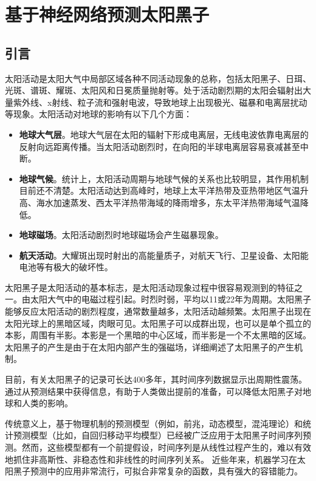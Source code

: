 \chapter{基于神经网络预测太阳黑子}\label{chap:ml_sunspot}

\section{引言}\label{sec:ss_intro}

太阳活动是太阳大气中局部区域各种不同活动现象的总称，包括太阳黑子、日珥、光斑、谱斑、耀斑、太阳风和日冕质量抛射等。处于活动剧烈期的太阳会辐射出大量紫外线、x射线、粒子流和强射电波，导致地球上出现极光、磁暴和电离层扰动等现象。太阳活动对地球的影响有以下几个方面\citep{jie2012prediction}：
\begin{itemize}
  \item \textbf{地球大气层}。地球大气层在太阳的辐射下形成电离层，无线电波依靠电离层的反射向远距离传播。当太阳活动剧烈时，在向阳的半球电离层容易衰减甚至中断。
  \item \textbf{地球气候}。统计上，太阳活动周期与地球气候的关系也比较明显，其作用机制目前还不清楚。太阳活动达到高峰时，地球上太平洋热带及亚热带地区气温升高、海水加速蒸发、西太平洋热带海域的降雨增多，东太平洋热带海域气温降低。
  \item \textbf{地球磁场}。太阳活动剧烈时地球磁场会产生磁暴现象。
  \item \textbf{航天活动}。大耀斑出现时射出的高能量质子，对航天飞行、卫星设备、太阳能电池等有极大的破坏性。
\end{itemize}

太阳黑子是太阳活动的基本标志，是太阳活动现象过程中很容易观测到的特征之一。由太阳大气中的电磁过程引起。时烈时弱，平均以11或22年为周期。太阳黑子能够反应太阳活动的剧烈程度，通常数量越多，太阳活动越频繁。太阳黑子出现在太阳光球上的黑暗区域，肉眼可见。太阳黑子可以成群出现，也可以是单个孤立的本影，周围有半影。本影是一个黑暗的中心区域，而半影是一个不太黑暗的区域。太阳黑子的产生是由于在太阳内部产生的强磁场，\citet{noyes2013sun}详细阐述了太阳黑子的产生机制。

目前，有关太阳黑子的记录可长达400多年，其时间序列数据显示出周期性震荡。通过从预测结果中获得信息，有助于人类做出提前的准备，可以降低太阳黑子对地球和人类的影响。

传统意义上，基于物理机制的预测模型（例如，前兆，动态模型，混沌理论\citep{jie2012prediction}）和统计预测模型（比如，自回归移动平均模型）已经被广泛应用于太阳黑子时间序列预测。然而，这些模型都有一个前提假设，时间序列是从线性过程产生的，难以有效地抓住非高斯性、非稳态性和非线性的时间序列关系\citep{jiang2011sunspot,arlt2015solar}。
近些年来，机器学习在太阳黑子预测中的应用非常流行\citep{pala2019forecasting}，可拟合非常复杂的函数，具有强大的容错能力。

